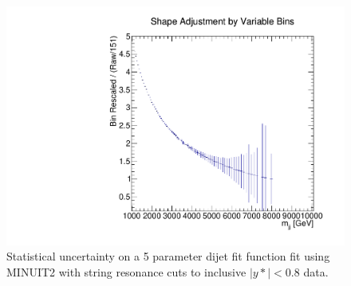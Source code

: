 
\begin{figure}
    \centering
    \includegraphics[width=1\linewidth]{figures/app-GlobalFitStudies/BinningShapeAdjustment.pdf}
    \caption{Statistical uncertainty on a 5 parameter dijet fit function fit using MINUIT2 with string resonance cuts to inclusive $|y*|<0.8$ data.}
    \label{fig:BinningShapeAdjustment}
\end{figure}


